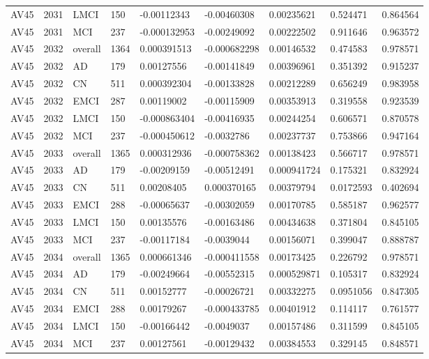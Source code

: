 \begin{landscape}
\begin{longtable}{lllllllll}
AV45 & 2031 & LMCI & 150 & -0.00112343 & -0.00460308 & 0.00235621 & 0.524471 & 0.864564 \\
AV45 & 2031 & MCI & 237 & -0.000132953 & -0.00249092 & 0.00222502 & 0.911646 & 0.963572 \\
AV45 & 2032 & overall & 1364 & 0.000391513 & -0.000682298 & 0.00146532 & 0.474583 & 0.978571 \\
AV45 & 2032 & AD & 179 & 0.00127556 & -0.00141849 & 0.00396961 & 0.351392 & 0.915237 \\
AV45 & 2032 & CN & 511 & 0.000392304 & -0.00133828 & 0.00212289 & 0.656249 & 0.983958 \\
AV45 & 2032 & EMCI & 287 & 0.00119002 & -0.00115909 & 0.00353913 & 0.319558 & 0.923539 \\
AV45 & 2032 & LMCI & 150 & -0.000863404 & -0.00416935 & 0.00244254 & 0.606571 & 0.870578 \\
AV45 & 2032 & MCI & 237 & -0.000450612 & -0.0032786 & 0.00237737 & 0.753866 & 0.947164 \\
AV45 & 2033 & overall & 1365 & 0.000312936 & -0.000758362 & 0.00138423 & 0.566717 & 0.978571 \\
AV45 & 2033 & AD & 179 & -0.00209159 & -0.00512491 & 0.000941724 & 0.175321 & 0.832924 \\
AV45 & 2033 & CN & 511 & 0.00208405 & 0.000370165 & 0.00379794 & 0.0172593 & 0.402694 \\
AV45 & 2033 & EMCI & 288 & -0.00065637 & -0.00302059 & 0.00170785 & 0.585187 & 0.962577 \\
AV45 & 2033 & LMCI & 150 & 0.00135576 & -0.00163486 & 0.00434638 & 0.371804 & 0.845105 \\
AV45 & 2033 & MCI & 237 & -0.00117184 & -0.0039044 & 0.00156071 & 0.399047 & 0.888787 \\
AV45 & 2034 & overall & 1365 & 0.000661346 & -0.000411558 & 0.00173425 & 0.226792 & 0.978571 \\
AV45 & 2034 & AD & 179 & -0.00249664 & -0.00552315 & 0.000529871 & 0.105317 & 0.832924 \\
AV45 & 2034 & CN & 511 & 0.00152777 & -0.00026721 & 0.00332275 & 0.0951056 & 0.847305 \\
AV45 & 2034 & EMCI & 288 & 0.00179267 & -0.000433785 & 0.00401912 & 0.114117 & 0.761577 \\
AV45 & 2034 & LMCI & 150 & -0.00166442 & -0.0049037 & 0.00157486 & 0.311599 & 0.845105 \\
AV45 & 2034 & MCI & 237 & 0.00127561 & -0.00129432 & 0.00384553 & 0.329145 & 0.848571 \\

\end{longtable}
\end{landscape}
